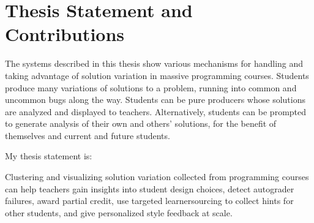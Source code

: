 \section{Thesis Statement and Contributions}

The systems described in this thesis show various mechanisms for handling and taking advantage of solution variation in massive programming courses. Students produce many variations of solutions to a problem, running into common and uncommon bugs along the way. Students can be pure producers whose solutions are analyzed and displayed to teachers. Alternatively, students can be prompted to generate analysis of their own and others' solutions, for the benefit of themselves and current and future students. %

My thesis statement is: 
\begin{displayquote}
Clustering and visualizing solution variation collected from programming courses can help teachers gain insights into student design choices, detect autograder failures, award partial credit, use targeted learnersourcing to collect hints for other students, and give personalized style feedback at scale.
\end{displayquote}

